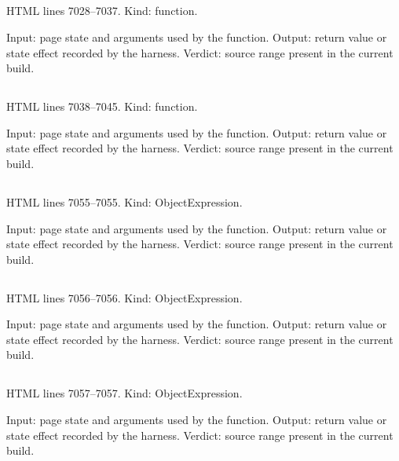 \subsection*{\texttt{}}
\label{vf_347_validateRunBoundary}
HTML lines 7028--7037. Kind: function.

Input: page state and arguments used by the function.
Output: return value or state effect recorded by the harness.
Verdict: source range present in the current build.

\subsection*{\texttt{}}
\label{vf_348_validateHistoryBoundary}
HTML lines 7038--7045. Kind: function.

Input: page state and arguments used by the function.
Output: return value or state effect recorded by the harness.
Verdict: source range present in the current build.

\subsection*{\texttt{}}
\label{vf_349_MG}
HTML lines 7055--7055. Kind: ObjectExpression.

Input: page state and arguments used by the function.
Output: return value or state effect recorded by the harness.
Verdict: source range present in the current build.

\subsection*{\texttt{}}
\label{vf_350_MG_GLYPH}
HTML lines 7056--7056. Kind: ObjectExpression.

Input: page state and arguments used by the function.
Output: return value or state effect recorded by the harness.
Verdict: source range present in the current build.

\subsection*{\texttt{}}
\label{vf_351_MG_WORD}
HTML lines 7057--7057. Kind: ObjectExpression.

Input: page state and arguments used by the function.
Output: return value or state effect recorded by the harness.
Verdict: source range present in the current build.

